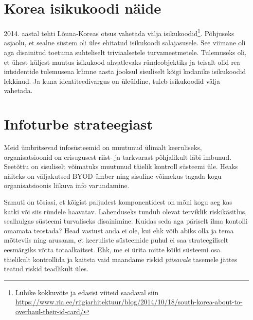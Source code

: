 \documentclass{tufte-book}
\begin{document}
\section{Korea isikukoodi näide}
2014. aastal tehti Lõuna-Koreas otsus vahetada välja isikukoodid\footnote{Lühike kokkuvõte ja edasisi viiteid saadaval siin \url{https://www.ria.ee/riigiarhitektuur/blog/2014/10/18/south-korea-about-to-overhaul-their-id-card/}}. Põhjuseks asjaolu, et sealne süstem oli üles ehitatud isikukoodi salajasusele. See viimane oli aga disainitud toetuma suhteliselt triviaalsetele turvameetmetele. Tulemuseks oli, et ühest küljest muutus isikukood ahvatlevaks ründeobjektiks ja teisalt olid rea intsidentide tulemusena kümne aasta jooksul sisuliselt kõigi kodanike isikukoodid lekkinud. Ja kuna identiteedivargus on üleüldine, tuleb isikukoodid välja vahetada.

\section{Infoturbe strateegiast}
Meid ümbritsevad infosüsteemid on muutunud ülimalt keeruliseks, organisatsioonid on erisugusest riist- ja tarkvarast põhjalikult läbi imbunud. Seetõttu on sisuliselt võimatuks muutunud täielik kontroll süsteemi üle. Heaks näiteks on väljakutsed BYOD ümber ning sisuline võimekus tagada kogu organisatsioonis liikuva info varundamine. 

Samuti on tõsiasi, et kõigist paljudest komponentidest on mõni kogu aeg kas katki või siis ründele haavatav. Lahenduseks tundub olevat terviklik riskikäsitlus, sealhulgas süsteemi turvaliseks disainimine. Kuidas seda aga päriselt ilma kontolli omamata teostada? Head vastust anda ei ole, kui ehk võib abiks olla \citeauthor{leveson2011engineering}\cite{leveson2011engineering} ja tema mõtteviis ning arusaam, et keeruliste süsteemide puhul ei saa strateegiliselt eesmärgiks võtta totaalkaitset. Ehk, me ei ürita mitte kõiki süsteemi osa täielikult kontrollida ja kaitsta vaid maandame riskid \emph{piisavale} tasemele jättes teatud riskid teadlikult üles. 
\end{document}
